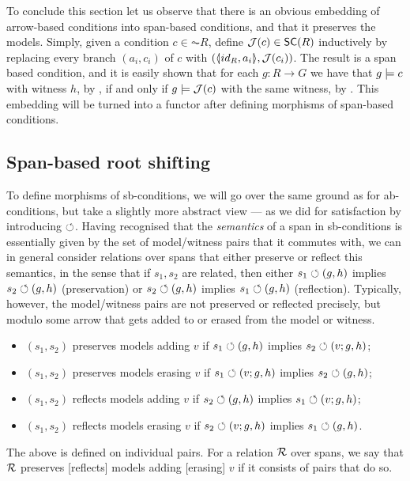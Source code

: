  To conclude this section let us observe that there is an obvious embedding of arrow-based conditions into span-based conditions, and that it preserves the models. Simply, given a condition $c \in \AC {R}$, define $\cJ(c)\in \SC R$ inductively by replacing every branch $(a_i,c_i)$ of $c$ with $(\spanof{id_R}{a_i},\cJ(c_i))$. 
The result is a span based condition, and it is easily shown that for each $g:R \to G$ we have that $g \models c$ with witness $h$, by , if and only if $g \models \mathcal{J}(c)$ with the same witness, by . This embedding will be turned into a functor after defining morphisms of span-based conditions. 

\subsection{Span-based root shifting}

To define morphisms of sb-conditions, we will go over the same ground as for ab-conditions, but take a slightly more abstract view --- as we did for satisfaction by introducing $\circlearrowleft$. Having recognised that the \emph{semantics} of a span in sb-conditions is essentially given by the set of model/witness pairs that it commutes with, we can in general consider relations over spans that either preserve or reflect this semantics, in the sense that if $s_1,s_2$ are related, then either $s_1\circlearrowleft (g,h)$ implies $s_2\circlearrowleft (g,h)$ (preservation) or $s_2\circlearrowleft (g,h)$ implies $s_1\circlearrowleft (g,h)$ (reflection). Typically, however, the model/witness pairs are not preserved or reflected precisely, but modulo some arrow that gets added to or erased from the model or witness.
%
\begin{itemize}
\item $(s_1,s_2)$ preserves models adding $v$ if $s_1\circlearrowleft (g,h)$ implies $s_2\circlearrowleft (v;g,h)$;
\item $(s_1,s_2)$ preserves models erasing $v$ if $s_1\circlearrowleft (v;g,h)$ implies $s_2\circlearrowleft (g,h)$;
\item $(s_1,s_2)$ reflects models adding $v$ if $s_2\circlearrowleft (g,h)$ implies $s_1\circlearrowleft (v;g,h)$;
\item $(s_1,s_2)$ reflects models erasing $v$ if $s_2\circlearrowleft (v;g,h)$ implies $s_1\circlearrowleft (g,h)$.
\end{itemize}
%
The above is defined on individual pairs. For a relation $\mathcal{R}$ over spans, we say that $\mathcal{R}$ preserves [reflects] models adding [erasing] $v$ if it consists of pairs that do so.

